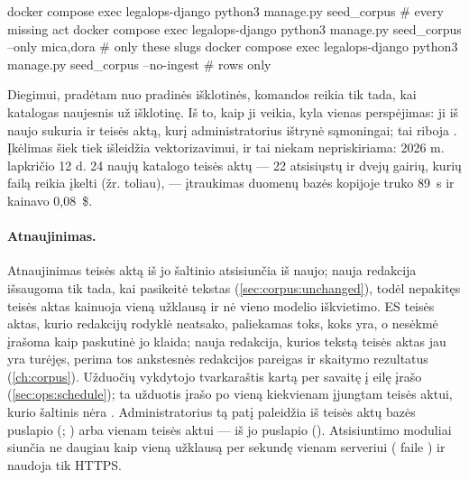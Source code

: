 \begin{codeblock}
docker compose exec legalops-django python3 manage.py seed_corpus                   # every missing act
docker compose exec legalops-django python3 manage.py seed_corpus --only mica,dora  # only these slugs
docker compose exec legalops-django python3 manage.py seed_corpus --no-ingest       # rows only
\end{codeblock}

Diegimui, pradėtam nuo pradinės išklotinės, komandos reikia tik tada, kai katalogas naujesnis už
išklotinę. Iš to, kaip ji veikia, kyla vienas perspėjimas: ji iš naujo sukuria ir teisės aktą,
kurį administratorius ištrynė sąmoningai; tai riboja . Įkėlimas šiek tiek išleidžia
vektorizavimui, ir tai niekam nepriskiriama: 2026 m. lapkričio 12 d. 24 naujų katalogo teisės aktų
--- 22 atsisiųstų ir dvejų gairių, kurių failą reikia įkelti (žr. toliau), --- įtraukimas
duomenų bazės kopijoje truko 89~s ir kainavo 0,08~\$.

\paragraph{Atnaujinimas.} Atnaujinimas teisės aktą iš jo šaltinio atsisiunčia iš naujo; nauja
redakcija išsaugoma tik tada, kai pasikeitė tekstas (\cref{sec:corpus:unchanged}), todėl nepakitęs
teisės aktas kainuoja
vieną užklausą ir nė vieno modelio iškvietimo. ES teisės aktas, kurio redakcijų rodyklė
neatsako, paliekamas toks, koks yra, o nesėkmė įrašoma kaip paskutinė jo klaida; nauja
redakcija, kurios tekstą teisės aktas jau yra turėjęs, perima tos ankstesnės redakcijos
pareigas ir skaitymo rezultatus (\cref{ch:corpus}). Užduočių vykdytojo tvarkaraštis kartą per savaitę į
eilę įrašo  (\cref{sec:ops:schedule}); ta užduotis įrašo po vieną
 kiekvienam įjungtam teisės aktui, kurio šaltinis nėra .
Administratorius tą patį paleidžia iš teisės aktų bazės puslapio (;
) arba vienam teisės aktui --- iš jo puslapio
(). Atsisiuntimo moduliai siunčia ne daugiau kaip
vieną užklausą per sekundę vienam serveriui ( faile
) ir naudoja tik HTTPS.

